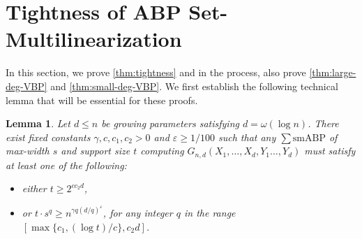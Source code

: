 \documentclass[10pt,a4paper]{article}
\newtheorem{lem}[theorem]{Lemma}
\theoremstyle{definition}%
\theoremstyle{plain}
\newcommand{\sbp}{\sum\mathrm{smABP}}
\newcommand{\eps}{\varepsilon}
\begin{document}
\section{Tightness of ABP Set-Multilinearization}\label{sec:tightness}

In this section, we prove \autoref{thm:tightness} and in the process, also prove \autoref{thm:large-deg-VBP} and \autoref{thm:small-deg-VBP}. We first establish the following technical lemma that will be essential for these proofs. 

\begin{lem}\label{lem:VBP}
Let $d\leq n$ be growing parameters satisfying $d = \omega(\log n)$. There exist fixed constants $\gamma,c,c_1,c_2>0$ and $\eps\geq 1/100$ such that any $\sbp$ of max-width $s$ and support size $t$ computing $G_{n,d}(X_1,\ldots,X_d,Y_1\ldots,Y_d)$ must satisfy at least one of the following:
\begin{itemize}
    \item either $t\geq 2^{cc_2d}$,
    \item or $t\cdot s^q \geq n^{{{\gamma q(d/q)^\eps}}}$, for any integer $q$ in the range $ [\max\{c_1,(\log t)/c\}, c_2d]$.
\end{itemize}
\end{lem}
\end{document}
